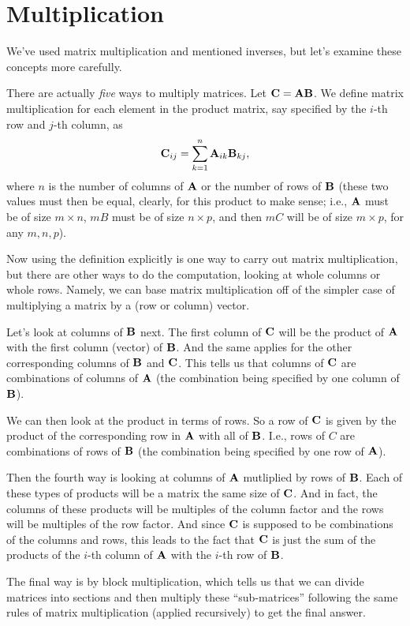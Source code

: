 \section{Multiplication}

We've used matrix multiplication and mentioned inverses, but let's examine these concepts more carefully. 

There are actually \textit{five} ways to multiply matrices. Let $\boldsymbol{\mathbf{C}} = \boldsymbol{\mathbf{A}}\boldsymbol{\mathbf{B}}$. We define matrix multiplication for each element in the product matrix, say specified by the $i$-th row and $j$-th column, as
\[ \boldsymbol{\mathbf{C}}_{ij} = \sum_{k=1}^n \boldsymbol{\mathbf{A}}_{ik}\boldsymbol{\mathbf{B}}_{kj}, \]
where $n$ is the number of columns of $\boldsymbol{\mathbf{A}}$ or the number of rows of $\boldsymbol{\mathbf{B}}$ (these two values must then be equal, clearly, for this product to make sense; i.e., $\boldsymbol{\mathbf{A}}$ must be of size $m\times n$, $mB$ must be of size $n\times p$, and then $mC$ will be of size $m\times p$, for any $m,n,p$). 

Now using the definition explicitly is one way to carry out matrix multiplication, but there are other ways to do the computation, looking at whole columns or whole rows. Namely, we can base matrix multiplication off of the simpler case of multiplying a matrix by a (row or column) vector.

Let's look at columns of $\boldsymbol{\mathbf{B}}$ next. The first column of $\boldsymbol{\mathbf{C}}$ will be the product of $\boldsymbol{\mathbf{A}}$ with the first column (vector) of $\boldsymbol{\mathbf{B}}$. And the same applies for the other corresponding columns of $\boldsymbol{\mathbf{B}}$ and $\boldsymbol{\mathbf{C}}$. This tells us that columns of $\boldsymbol{\mathbf{C}}$ are combinations of columns of $\boldsymbol{\mathbf{A}}$ (the combination being specified by one column of $\boldsymbol{\mathbf{B}}$). 

We can then look at the product in terms of rows. So a row of $\boldsymbol{\mathbf{C}}$ is given by the product of the corresponding row in $\boldsymbol{\mathbf{A}}$ with all of $\boldsymbol{\mathbf{B}}$. I.e., rows of $C$ are combinations of rows of $\boldsymbol{\mathbf{B}}$ (the combination being specified by one row of $\boldsymbol{\mathbf{A}}$). 

Then the fourth way is looking at columns of $\boldsymbol{\mathbf{A}}$ mutliplied by rows of $\boldsymbol{\mathbf{B}}$. Each of these types of products will be a matrix the same size of $\boldsymbol{\mathbf{C}}$. And in fact, the columns of these products will be multiples of the column factor and the rows will be multiples of the row factor. And since $\boldsymbol{\mathbf{C}}$ is supposed to be combinations of the columns and rows, this leads to the fact that $\boldsymbol{\mathbf{C}}$ is just the sum of the products of the $i$-th column of $\boldsymbol{\mathbf{A}}$ with the $i$-th row of $\boldsymbol{\mathbf{B}}$. 

The final way is by block multiplication, which tells us that we can divide matrices into sections and then multiply these ``sub-matrices'' following the same rules of matrix multiplication (applied recursively) to get the final answer.

